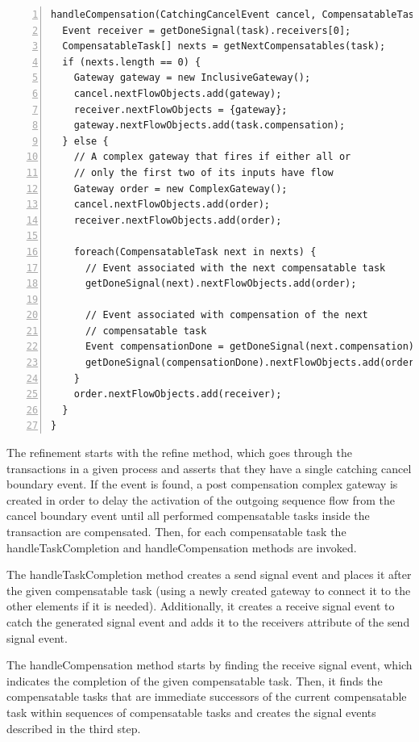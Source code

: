 \begin{lstlisting}[float,numbers=left,numbersep=5pt,mathescape=true,caption=Refinement of transactions (dealing with compensations),label=lst:nrefine3]
handleCompensation(CatchingCancelEvent cancel, CompensatableTask task) {
  Event receiver = getDoneSignal(task).receivers[0];
  CompensatableTask[] nexts = getNextCompensatables(task);
  if (nexts.length == 0) {
    Gateway gateway = new InclusiveGateway();
    cancel.nextFlowObjects.add(gateway);
    receiver.nextFlowObjects = {gateway};
    gateway.nextFlowObjects.add(task.compensation);
  } else {
    // A complex gateway that fires if either all or 
    // only the first two of its inputs have flow
    Gateway order = new ComplexGateway();
    cancel.nextFlowObjects.add(order);
    receiver.nextFlowObjects.add(order);
    
    foreach(CompensatableTask next in nexts) {
      // Event associated with the next compensatable task
      getDoneSignal(next).nextFlowObjects.add(order);
    
      // Event associated with compensation of the next
      // compensatable task
      Event compensationDone = getDoneSignal(next.compensation).receivers[0];
      getDoneSignal(compensationDone).nextFlowObjects.add(order);
    }
    order.nextFlowObjects.add(receiver);
  }
}
\end{lstlisting}

The refinement starts with the {refine} method, which goes through the {transactions} in a given {process} and asserts that they have a single {catching cancel boundary event}. If the {event} is found, a post compensation complex gateway is created in order to delay the activation of the outgoing sequence flow from the cancel boundary event until all performed compensatable tasks inside the transaction are compensated. Then, for each {compensatable task} the {handleTaskCompletion} and {handleCompensation} methods are invoked.

The {handleTaskCompletion} method creates a {send signal event} and places it after the given {compensatable task} (using a newly created {gateway} to connect it to the other elements if it is needed). Additionally, it creates a {receive signal event} to catch the generated {signal event} and adds it to the {receivers} attribute of the {send signal event}.

The {handleCompensation} method starts by finding the {receive signal event}, which indicates the completion of the given {compensatable task}. Then, it finds the {compensatable tasks} that are immediate successors of the current {compensatable task} within sequences of {compensatable tasks} and creates the signal events described in the third step. 

